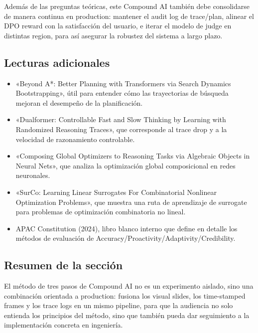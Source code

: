 \documentclass[a4paper]{article}
\begin{document}
Además de las preguntas teóricas, este Compound AI también debe consolidarse de manera continua en production: mantener el audit log de trace/plan, alinear el DPO reward con la satisfacción del usuario, e iterar el modelo de judge en distintas region, para así asegurar la robustez del sistema a largo plazo.

\subsection{Lecturas adicionales}
\begin{itemize}
    \item «Beyond A*: Better Planning with Transformers via Search Dynamics Bootstrapping», útil para entender cómo las trayectorias de búsqueda mejoran el desempeño de la planificación.
    \item «Dualformer: Controllable Fast and Slow Thinking by Learning with Randomized Reasoning Traces», que corresponde al trace drop y a la velocidad de razonamiento controlable.
    \item «Composing Global Optimizers to Reasoning Tasks via Algebraic Objects in Neural Nets», que analiza la optimización global composicional en redes neuronales.
    \item «SurCo: Learning Linear Surrogates For Combinatorial Nonlinear Optimization Problems», que muestra una ruta de aprendizaje de surrogate para problemas de optimización combinatoria no lineal.
    \item APAC Constitution (2024), libro blanco interno que define en detalle los métodos de evaluación de Accuracy/Proactivity/Adaptivity/Credibility.
\end{itemize}

\subsection{Resumen de la sección}
El método de tres pasos de Compound AI no es un experimento aislado, sino una combinación orientada a production: fusiona los visual slides, los time-stamped frames y los trace logs en un mismo pipeline, para que la audiencia no solo entienda los principios del método, sino que también pueda dar seguimiento a la implementación concreta en ingeniería.
\end{document}
